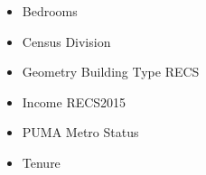 \begin{itemize}
\item Bedrooms
\item Census Division
\item Geometry Building Type RECS
\item Income RECS2015
\item PUMA Metro Status
\item Tenure
\end{itemize}
